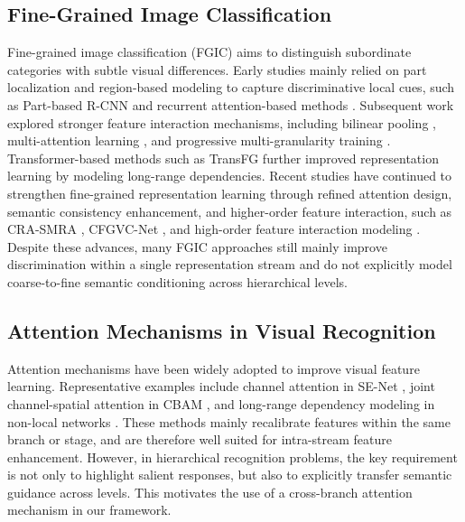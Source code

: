 \documentclass[pdflatex,sn-mathphys-num]{sn-jnl}
\theoremstyle{thmstyleone}%
\theoremstyle{thmstyletwo}%
\theoremstyle{thmstylethree}%
\begin{document}
\subsection{Fine-Grained Image Classification}
Fine-grained image classification (FGIC) aims to distinguish subordinate categories with subtle visual differences. 
Early studies mainly relied on part localization and region-based modeling to capture discriminative local cues, such as Part-based R-CNN \cite{part_rcnn} and recurrent attention-based methods \cite{fu2017look}. 
Subsequent work explored stronger feature interaction mechanisms, including bilinear pooling \cite{bilinear_cnn}, multi-attention learning \cite{zheng2017learning}, and progressive multi-granularity training \cite{du2020fine}. 
Transformer-based methods such as TransFG \cite{he2021transfg} further improved representation learning by modeling long-range dependencies. 
Recent studies have continued to strengthen fine-grained representation learning through refined attention design, semantic consistency enhancement, and higher-order feature interaction, such as CRA-SMRA \cite{wang2025crasmra}, CFGVC-Net \cite{wang2025cfgvc}, and high-order feature interaction modeling \cite{sikdar2025interweaving}. 
Despite these advances, many FGIC approaches still mainly improve discrimination within a single representation stream and do not explicitly model coarse-to-fine semantic conditioning across hierarchical levels.

\subsection{Attention Mechanisms in Visual Recognition}
Attention mechanisms have been widely adopted to improve visual feature learning. 
Representative examples include channel attention in SE-Net \cite{hu2018squeeze}, joint channel-spatial attention in CBAM \cite{woo2018cbam}, and long-range dependency modeling in non-local networks \cite{nonlocal}. 
These methods mainly recalibrate features within the same branch or stage, and are therefore well suited for intra-stream feature enhancement. 
However, in hierarchical recognition problems, the key requirement is not only to highlight salient responses, but also to explicitly transfer semantic guidance across levels. 
This motivates the use of a cross-branch attention mechanism in our framework.
\end{document}
